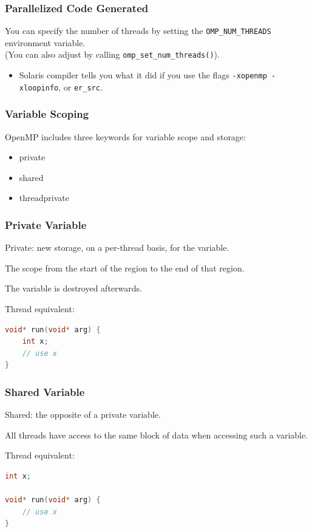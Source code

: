 \begin{frame}[containsverbatim]
  \frametitle{Parallelized Code Generated}

You can specify the number of threads by setting the
\verb+OMP_NUM_THREADS+ environment variable. \\

(You can also adjust by calling 
\verb+omp_set_num_threads()+).

\begin{itemize}
  \item Solaris compiler tells you what it did if you use the flags \verb+-xopenmp -xloopinfo+, or \verb+er_src+.
\end{itemize}

  


\end{frame}

\begin{frame}[fragile]
  \frametitle{Variable Scoping}
OpenMP includes three keywords for variable scope and storage:
\begin{itemize}
        \item private
        \item shared
        \item threadprivate
\end{itemize}


\end{frame}


\begin{frame}[fragile]
\frametitle{Private Variable}


Private: new storage, on a per-thread basis, for the variable.

The scope from the start of the region to the end of that region.

The variable is destroyed afterwards.

Thread equivalent:

  \begin{lstlisting}[language=C]
void* run(void* arg) {
    int x;
    // use x
}
  \end{lstlisting}

\end{frame}


\begin{frame}[fragile]
\frametitle{Shared Variable}

Shared: the opposite of a private variable.
 
All threads have access to the same block of data when accessing such a variable.

Thread equivalent:

  \begin{lstlisting}[language=C]
int x;

void* run(void* arg) {
    // use x
}
  \end{lstlisting}

\end{frame}


